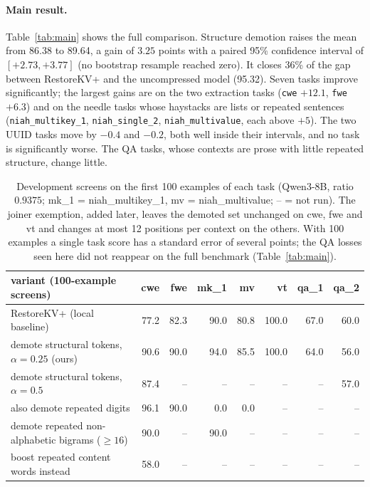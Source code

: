 \documentclass[11pt]{article}
\begin{document}
\paragraph{Main result.} Table~\ref{tab:main} shows the full comparison. Structure demotion raises the mean from 86.38 to 89.64, a
gain of $3.25$ points with a paired 95\% confidence interval of $[+2.73, +3.77]$ (no bootstrap resample reached zero). It closes
36\% of the gap between RestoreKV+ and the uncompressed model (95.32). Seven tasks improve significantly; the largest gains are on
the two extraction tasks (\texttt{cwe} $+12.1$, \texttt{fwe} $+6.3$) and on the needle tasks whose haystacks are lists or repeated
sentences (\texttt{niah\_multikey\_1}, \texttt{niah\_single\_2}, \texttt{niah\_multivalue}, each above $+5$). The two UUID tasks
move by $-0.4$ and $-0.2$, both well inside their intervals, and no task is significantly worse. The QA tasks, whose contexts are
prose with little repeated structure, change little.

\begin{table}[t]
\centering
\small
\begin{tabular}{lrrrrrrr}
\toprule
variant (100-example screens) & cwe & fwe & mk\_1 & mv & vt & qa\_1 & qa\_2 \\
\midrule
RestoreKV+ (local baseline) & 77.2 & 82.3 & 90.0 & 80.8 & 100.0 & 67.0 & 60.0 \\
demote structural tokens, $\alpha=0.25$ (ours) & 90.6 & 90.0 & 94.0 & 85.5 & 100.0 & 64.0 & 56.0 \\
demote structural tokens, $\alpha=0.5$ & 87.4 & -- & -- & -- & -- & -- & 57.0 \\
also demote repeated digits & 96.1 & 90.0 & 0.0 & 0.0 & -- & -- & -- \\
demote repeated non-alphabetic bigrams ($\geq 16$) & 90.0 & -- & 90.0 & -- & -- & -- & -- \\
boost repeated content words instead & 58.0 & -- & -- & -- & -- & -- & -- \\
\bottomrule
\end{tabular}
\caption{Development screens on the first 100 examples of each task (Qwen3-8B, ratio $0.9375$; mk\_1 = niah\_multikey\_1,
mv = niah\_multivalue; -- = not run). The joiner exemption, added later, leaves the demoted set unchanged on cwe, fwe and vt and changes at most 12 positions per context on the others. With 100
examples a single task score has a standard error of several points; the QA losses seen here did not reappear on the full
benchmark (Table~\ref{tab:main}).}
\label{tab:ablation}
\end{table}
\end{document}
